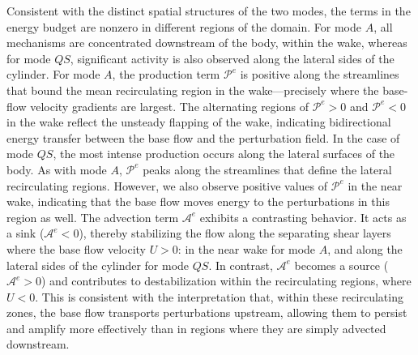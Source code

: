 Consistent with the distinct spatial structures of the two modes, the terms in the energy budget are nonzero in different regions of the domain. For mode $A$, all mechanisms are concentrated downstream of the body, within the wake, whereas for mode $QS$, significant activity is also observed along the lateral sides of the cylinder. For mode $A$, the production term $\mathcal{P}^e$ is positive along the streamlines that bound the mean recirculating region in the wake—precisely where the base-flow velocity gradients are largest. The alternating regions of $\mathcal{P}^e > 0$ and $\mathcal{P}^e < 0$ in the wake reflect the unsteady flapping of the wake, indicating bidirectional energy transfer between the base flow and the perturbation field.
%
In the case of mode $QS$, the most intense production occurs along the lateral surfaces of the body. As with mode $A$, $\mathcal{P}^e$ peaks along the streamlines that define the lateral recirculating regions. However, we also observe positive values of $\mathcal{P}^e$ in the near wake, indicating that the base flow moves energy to the perturbations in this region as well.
%
The advection term $\mathcal{A}^e$ exhibits a contrasting behavior. It acts as a sink ($\mathcal{A}^e < 0$), thereby stabilizing the flow along the separating shear layers where the base flow velocity $U > 0$: in the near wake for mode $A$, and along the lateral sides of the cylinder for mode $QS$. In contrast, $\mathcal{A}^e$ becomes a source ($\mathcal{A}^e > 0$) and contributes to destabilization within the recirculating regions, where $U < 0$. This is consistent with the interpretation that, within these recirculating zones, the base flow transports perturbations upstream, allowing them to persist and amplify more effectively than in regions where they are simply advected downstream.

